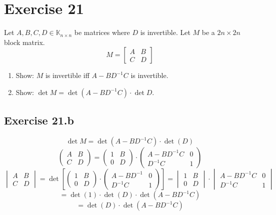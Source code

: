 \documentclass[a4paper]{article}
\theoremstyle{definition}
\begin{document}
\section{Exercise 21}
\begin{ex}
  Let $A, B, C, D \in \mathbb K_{n\times n}$ be matrices where $D$ is invertible.
  Let $M$ be a $2n \times 2n$ block matrix.
  \[
    M = \begin{bmatrix}
      A & B \\
      C & D
    \end{bmatrix}
  \]
  \begin{enumerate}
    \item Show: $M$ is invertible iff $A - BD^{-1}C$ is invertible.
    \item Show: $\det{M} = \det(A - BD^{-1} C) \cdot \det{D}$.
  \end{enumerate}
\end{ex}

\subsection{Exercise 21.b}

\[
  \det{M} = \det(A - B D^{-1} C) \cdot \det(D)
\] \[
  \begin{pmatrix}
    A & B \\
    C & D
  \end{pmatrix} = \begin{pmatrix}
    1 & B \\
    0 & D
  \end{pmatrix} \cdot \begin{pmatrix}
    A - BD^{-1} C & 0 \\
    D^{-1} C & 1
  \end{pmatrix}
\] \[
  \begin{vmatrix}
    A & B \\
    C & D
  \end{vmatrix}
  = \operatorname{det}\left[
    \begin{pmatrix}
      1 & B \\
      0 & D
    \end{pmatrix} \cdot \begin{pmatrix}
      A - BD^{-1} & 0 \\
      D^{-1} C & 1
    \end{pmatrix}
  \right]
  = \begin{vmatrix}
  1 & B \\
  0 & D
  \end{vmatrix} \cdot \begin{vmatrix}
  A - B D^{-1} C & 0 \\
  D^{-1} C & 1
  \end{vmatrix}
\] \[
  = \det(1) \cdot \det(D) \cdot \det(A - BD^{-1} C)
\] \[
  = \det(D) \cdot \det(A - BD^{-1} C)
\]
\end{document}
